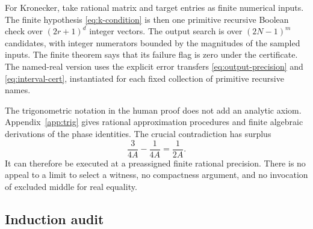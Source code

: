 \documentclass[11pt]{article}
\theoremstyle{definition}\newtheorem{definition}[theorem]{Definition}
\theoremstyle{remark}\newtheorem{remark}[theorem]{Remark}
\begin{document}
For Kronecker, take rational matrix and target entries as finite numerical inputs. The finite hypothesis \eqref{eq:k-condition} is then one primitive recursive Boolean check over $(2r+1)^d$ integer vectors. The output search is over $(2N-1)^m$ candidates, with integer numerators bounded by the magnitudes of the sampled inputs. The finite theorem says that its failure flag is zero under the certificate. The named-real version uses the explicit error transfers \eqref{eq:output-precision} and \eqref{eq:interval-cert}, instantiated for each fixed collection of primitive recursive names.

The trigonometric notation in the human proof does not add an analytic axiom. Appendix~\ref{app:trig} gives rational approximation procedures and finite algebraic derivations of the phase identities. The crucial contradiction has surplus
\[
 \frac3{4A}-\frac1{4A}=\frac1{2A}.
\]
It can therefore be executed at a preassigned finite rational precision. There is no appeal to a limit to select a witness, no compactness argument, and no invocation of excluded middle for real equality.

\subsection{Induction audit}
\end{document}

